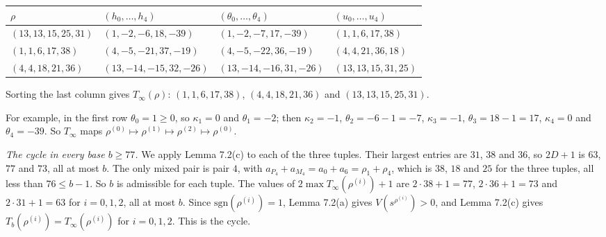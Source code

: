 \documentclass[11pt,letterpaper]{article}
\theoremstyle{paperstyle}
\theoremstyle{paperstyledef}
\theoremstyle{paperstylerem}
\begin{document}
{\def\LTcaptype{none} %
\begin{longtable}[]{@{}
  >{\raggedright\arraybackslash}p{}
  >{\raggedright\arraybackslash}p{}
  >{\raggedright\arraybackslash}p{}
  >{\raggedright\arraybackslash}p{}@{}}
\toprule\noalign{}
\begin{minipage}[b]{\linewidth}\raggedright
\(\rho\)
\end{minipage} & \begin{minipage}[b]{\linewidth}\raggedright
\((h_0, \dots, h_4)\)
\end{minipage} & \begin{minipage}[b]{\linewidth}\raggedright
\((\theta_0, \dots, \theta_4)\)
\end{minipage} & \begin{minipage}[b]{\linewidth}\raggedright
\((u_0, \dots, u_4)\)
\end{minipage} \\
\midrule\noalign{}
\endhead
\bottomrule\noalign{}
\endlastfoot
\((13,13,15,25,31)\) & \((1,-2,-6,18,-39)\) & \((1,-2,-7,17,-39)\) & \((1,1,6,17,38)\) \\
\((1,1,6,17,38)\) & \((4,-5,-21,37,-19)\) & \((4,-5,-22,36,-19)\) & \((4,4,21,36,18)\) \\
\((4,4,18,21,36)\) & \((13,-14,-15,32,-26)\) & \((13,-14,-16,31,-26)\) & \((13,13,15,31,25)\) \\
\end{longtable}
}

Sorting the last column gives \(T_\infty(\rho)\): \((1,1,6,17,38)\), \((4,4,18,21,36)\) and \((13,13,15,25,31)\).

For example, in the first row \(\theta_0 = 1 \ge 0\), so \(\kappa_1 = 0\) and \(\theta_1 = -2\); then \(\kappa_2 = -1\), \(\theta_2 = -6 - 1 = -7\), \(\kappa_3 = -1\), \(\theta_3 = 18 - 1 = 17\), \(\kappa_4 = 0\) and \(\theta_4 = -39\). So \(T_\infty\) maps \(\rho^{(0)} \mapsto \rho^{(1)} \mapsto \rho^{(2)} \mapsto \rho^{(0)}\).

\emph{The cycle in every base \(b \ge 77\).} We apply Lemma 7.2(c) to each of the three tuples. Their largest entries are \(31\), \(38\) and \(36\), so \(2D + 1\) is \(63\), \(77\) and \(73\), all at most \(b\). The only mixed pair is pair \(4\), with \(a_{P_4} + a_{M_4} = a_0 + a_6 = \rho_1 + \rho_4\), which is \(38\), \(18\) and \(25\) for the three tuples, all less than \(76 \le b - 1\). So \(b\) is admissible for each tuple. The values of \(2\max T_\infty(\rho^{(i)}) + 1\) are \(2 \cdot 38 + 1 = 77\), \(2 \cdot 36 + 1 = 73\) and \(2 \cdot 31 + 1 = 63\) for \(i = 0, 1, 2\), all at most \(b\). Since \(\mathrm{sgn}(\rho^{(i)}) = 1\), Lemma 7.2(a) gives \(V(s^{\rho^{(i)}}) > 0\), and Lemma 7.2(c) gives \(T_b(\rho^{(i)}) = T_\infty(\rho^{(i)})\) for \(i = 0, 1, 2\). This is the cycle.
\end{document}
